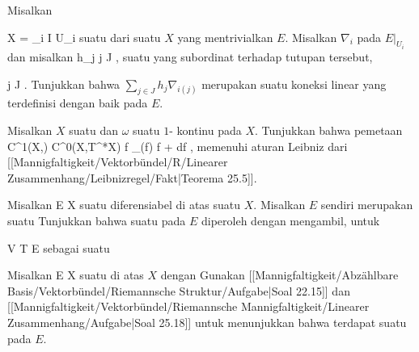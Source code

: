 {}
{

Misalkan

\mavergleichskette
{\vergleichskette
{ X
}
{ = }{ \bigcup_{i \in I} U_i
}
{  }{
}
{    }{
}
{   }{
}
}
{}{}{}
suatu
dari suatu
$X$ yang mentrivialkan
$E$. Misalkan $\nabla_i$
pada $E\vert_{U_i }$ dan misalkan
\mathkor {} {h_j} {} {j \in J} {,}
suatu
yang subordinat terhadap tutupan tersebut,

 {}
 {j \in J} {}
 {} {} {} {.}
Tunjukkan bahwa $\sum_{j \in J} h_j \nabla_{i(j)}$ merupakan suatu koneksi linear yang terdefinisi dengan baik pada $E$.

}
{} {}

{}
{

Misalkan $X$ suatu
dan $\omega$ suatu
$1$-
kontinu pada $X$. Tunjukkan bahwa pemetaan
\maabbeledisp {} {C^1(X,\R)} { C^0(X,T^*X)
} { f } { \nabla_\omega (f)  f \omega + df
} {,}
memenuhi aturan Leibniz dari
[[Mannigfaltigkeit/Vektorbündel/R/Linearer Zusammenhang/Leibnizregel/Fakt|Teorema 25.5]].

}
{} {}

{}
{

Misalkan
 { E } { X
} {}
suatu
diferensiabel di atas suatu
$X$. Misalkan $E$ sendiri merupakan suatu
Tunjukkan bahwa suatu
pada $E$ diperoleh dengan mengambil, untuk

\mavergleichskette
{\vergleichskette
{ V
}
{ \subseteq }{ T E
}
{  }{
}
{    }{
}
{   }{
}
}
{}{}{}
sebagai suatu

}
{} {}

{}
{

Misalkan
 { E } { X
} {}
suatu
di atas
$X$ dengan
Gunakan
[[Mannigfaltigkeit/Abzählbare Basis/Vektorbündel/Riemannsche Struktur/Aufgabe|Soal 22.15]]
dan
[[Mannigfaltigkeit/Vektorbündel/Riemannsche Mannigfaltigkeit/Linearer Zusammenhang/Aufgabe|Soal 25.18]]
untuk menunjukkan bahwa terdapat suatu
pada $E$.

}
{} {}

